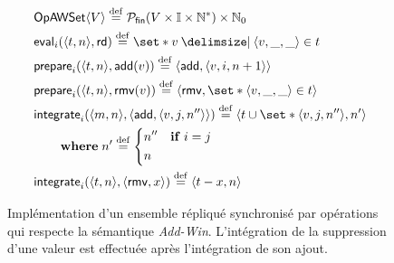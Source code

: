 \begin{figure}[bth]
\centering
\begin{align}
&\trm{OpAWSet}\tuple*{V} \defeq \powerfset{V \times \mathbb{I} \times \mathbb{N}^*} \times \mathbb{N}_0 \label{eq:op-awset-state}\\
&\trm{eval}_i(\tuple*{t, n}, \trm{rd}) \defeq \set*{v \given \tuple*{v, \_, \_} \in t} \label{eq:op-awset-eval}\\
&\trm{prepare}_i(\tuple*{t, n}, \trm{add}(v)) \defeq \tuple*{\trm{add}, \tuple*{v, i, n+1}} \label{eq:op-awset-prep-add}\\
&\trm{prepare}_i(\tuple*{t, n}, \trm{rmv}(v)) \defeq \tuple*{\trm{rmv}, \set*{\tuple*{v, \_, \_} \in t}} \label{eq:op-awset-prep-rmv}\\
&\begin{aligned}
\MoveEqLeft\trm{integrate}_i(\tuple*{m, n}, \tuple*{\trm{add}, \tuple*{v, j, n''}}) \defeq \tuple{t \cup \set*{\tuple*{v, j, n''}}, n'}\\
    &\where n' \defeq \begin{dcases}
        n'' & \when i = j\\
        n
    \end{dcases}
\end{aligned}\label{eq:op-awset-integr-add}\\
&\trm{integrate}_i(\tuple*{t, n}, \tuple*{\trm{rmv}, x}) \defeq \tuple*{t \sminus x, n} \label{eq:op-awset-integr-rmv}
\end{align}
\caption[Implémentation d'un ensemble répliqué synchronisé par opérations]{Implémentation d'un ensemble répliqué synchronisé par opérations qui respecte la sémantique \emph{Add-Win}.
L'intégration de la suppression d'une valeur est effectuée après l'intégration de son ajout.}\label{fig:op-add-win-set}
\end{figure}

